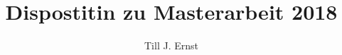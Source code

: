 


\title{Dispostitin zu Masterarbeit 2018}
\author{Till J. Ernst}













\begin{flushleft}
\nocite{*}
{}
\end{flushleft}


%
%
%